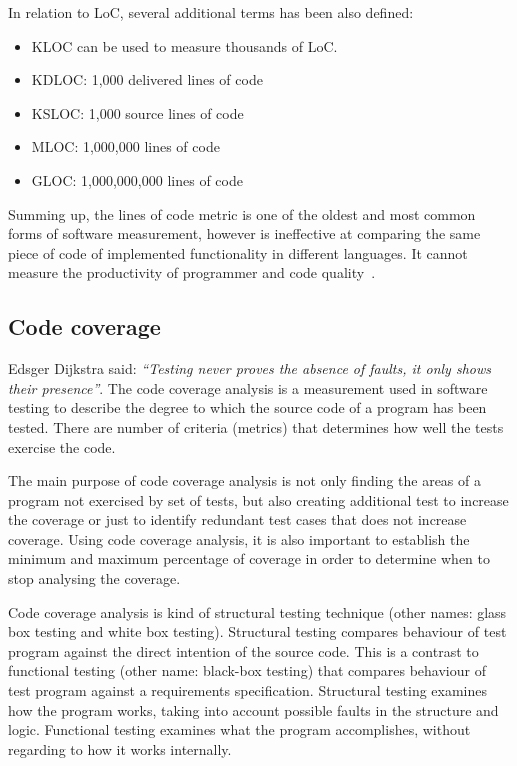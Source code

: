 In relation to \ac{LoC}, several additional terms has been also defined: 
\begin{itemize}
\item KLOC can be used to measure thousands of \ac{LoC}.
\item KDLOC: 1,000 delivered lines of code
\item KSLOC: 1,000 source lines of code
\item MLOC: 1,000,000 lines of code
\item GLOC: 1,000,000,000 lines of code
\end{itemize}

Summing up, the lines of code metric is one of the oldest and most common forms of software measurement, however is ineffective at comparing the same piece of code of implemented functionality in different languages. It cannot measure the productivity of programmer and code quality~\cite{metrics}.

\subsection{Code coverage}
Edsger Dijkstra said: \textit{``Testing never proves the absence of faults, it only shows their presence''}.
The code coverage analysis is a measurement used in software testing to describe the degree to which the source code of a program has been tested. There are number of criteria (metrics) that determines how well the tests exercise the code.

The main purpose of code coverage analysis is not only finding the areas of a program not exercised by set of tests, but also creating additional test to increase the coverage or just to identify redundant test cases that does not increase coverage. Using code coverage analysis, it is also important to establish the minimum and maximum percentage of coverage in order to determine when to stop analysing the coverage. 

Code coverage analysis is kind of structural testing technique (other names: glass box testing and white box testing). Structural testing compares behaviour of test program against the direct  intention of the source code. This is a contrast to functional testing (other name: black-box testing) that compares behaviour of test program against a requirements specification. Structural testing examines how the program works, taking into account possible faults in the structure and logic. Functional testing examines what the program accomplishes, without regarding to how it works internally.

